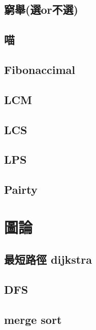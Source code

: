     \subsection{窮舉(選or不選)}
        
    \subsection{喵}
        
    \subsection{Fibonaccimal}
        
    \subsection{LCM}
        
    \subsection{LCS}
        
    \subsection{LPS}
        
    \subsection{Pairty}
        

\section{圖論}
    \subsection{最短路徑 dijkstra}
        
    \subsection{DFS}
        
    \subsection{merge sort}
          
